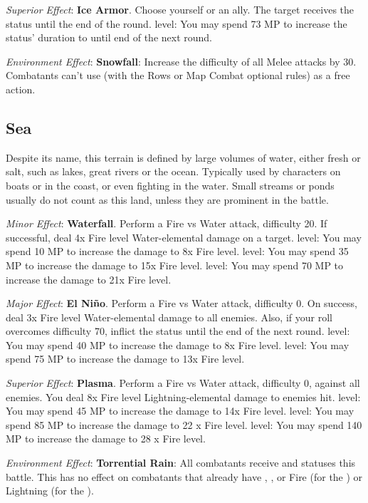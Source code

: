 \begin{multicols}{2}
\textit{Superior Effect}: \textbf{Ice Armor}. Choose yourself or an ally. The target receives the  status until the end of the round.  level: You may spend 73 MP to increase the status’ duration to until end of the next round.

\textit{Environment Effect}: \textbf{Snowfall}: Increase the difficulty of all Melee attacks by 30. Combatants can't use  (with the Rows or Map Combat optional rules) as a free action.

\subsection*{Sea}\label{subsec:geo-sea}
Despite its name, this terrain is defined by large volumes of water, either fresh or salt, such as lakes, great rivers or the ocean. Typically used by characters on boats or in the coast, or even fighting in the water. Small streams or ponds usually do not count as this land, unless they are prominent in the battle.

\textit{Minor Effect}: \textbf{Waterfall}. Perform a Fire vs Water attack, difficulty 20. If successful, deal 4x Fire level Water-elemental damage on a target.  level: You may spend 10 MP to increase the damage to 8x Fire level.  level: You may spend 35 MP to increase the damage to 15x Fire level.  level: You may spend 70 MP to increase the damage to 21x Fire level.

\textit{Major Effect}: \textbf{El Niño}. Perform a Fire vs Water attack, difficulty 0. On success, deal 3x Fire level Water-elemental damage to all enemies. Also, if your roll overcomes difficulty 70, inflict the  status until the end of the next round.  level: You may spend 40 MP to increase the damage to 8x Fire level.  level: You may spend 75 MP to increase the damage to 13x Fire level.

\textit{Superior Effect}: \textbf{Plasma}. Perform a Fire vs Water attack, difficulty 0, against all enemies. You deal 8x Fire level Lightning-elemental damage to enemies hit.  level: You may spend 45 MP to increase the damage to 14x Fire level.  level: You may spend 85 MP to increase the damage to 22 x Fire level.  level: You may spend 140 MP to increase the damage to 28 x Fire level.

\textit{Environment Effect}: \textbf{Torrential Rain}: All combatants receive  and  statuses this battle. This has no effect on combatants that already have , ,  or  Fire (for the ) or Lightning (for the ).


\end{multicols}
